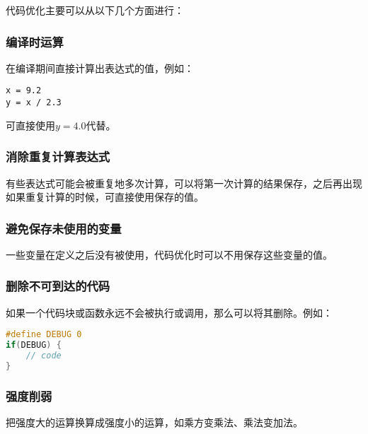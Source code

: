 代码优化主要可以从以下几个方面进行：

\subsubsection{编译时运算}

在编译期间直接计算出表达式的值，例如：

\vspace{-0.5cm}

\begin{lstlisting}
x = 9.2
y = x / 2.3
\end{lstlisting}

可直接使用$ y = 4.0 $代替。\\

\subsubsection{消除重复计算表达式}

有些表达式可能会被重复地多次计算，可以将第一次计算的结果保存，之后再出现如果重复计算的时候，可直接使用保存的值。\\

\subsubsection{避免保存未使用的变量}

一些变量在定义之后没有被使用，代码优化时可以不用保存这些变量的值。\\

\subsubsection{删除不可到达的代码}

如果一个代码块或函数永远不会被执行或调用，那么可以将其删除。例如：

\vspace{-0.5cm}

\begin{lstlisting}[language=C]
#define DEBUG 0
if(DEBUG) {
    // code
}
\end{lstlisting}

\vspace{0.5cm}

\subsubsection{强度削弱}

把强度大的运算换算成强度小的运算，如乘方变乘法、乘法变加法。\\


